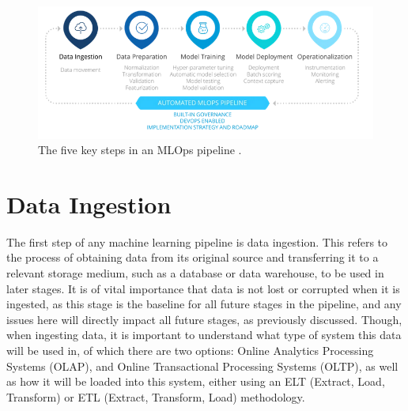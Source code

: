 \documentclass[12pt]{report}
\begin{document}





\begin{figure}[H]
    \centering
    \includegraphics[width=.75\linewidth]{MLPipeline.png}
    \caption{The five key steps in an MLOps pipeline \autocite{incycle_software_mlops_nodate}.}
    \label{fig:MLPipeline}
\end{figure}

\section{Data Ingestion}
The first step of any machine learning pipeline is data ingestion. This refers to the process of obtaining data from its original source
and transferring it to a relevant storage medium, such as a database or data warehouse, to be used in later stages. 
It is of vital importance that data is not lost or corrupted when it is ingested, as this stage is the baseline for all future stages in the pipeline, and any issues
here will directly impact all future stages, as previously discussed. Though, when ingesting data, it is important to understand what type of system this data 
will be used in, of which there are two options: Online Analytics Processing Systems (OLAP), and Online Transactional Processing Systems (OLTP), as well 
as how it will be loaded into this system, either using an ELT (Extract, Load, Transform) or ETL (Extract, Transform, Load) methodology.
\end{document}
